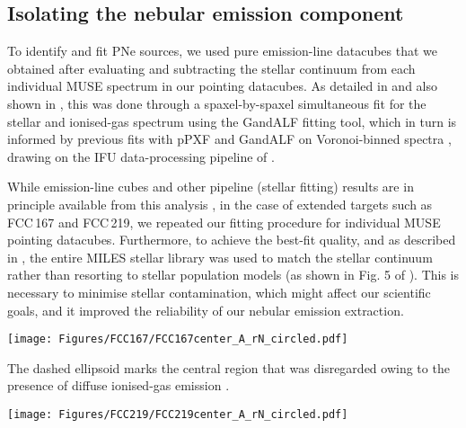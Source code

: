 \documentclass{aa}
\newcommand{\placefigone}{
\begin{figure*}
    \texttt{[image: Figures/FCC167/FCC167center\_A\_rN\_circled.pdf]}
    \caption{FCC\,167: Map of the peak amplitude to residual-noise level ratio (A/rN) of the [\ion{O}{iii}]5007 line, based on our spaxel-by-spaxel fit for the [\ion{O}{iii}] doublet in the emission datacube. The sources detected and labelled PNe are shown by a black circle. The over-luminous object (see Sect. 5.1) is highlighted by a black square. The PNe that mach those reported by \citet{feldmeier_calibrating_2007} are highlighted by blue squares.} The dashed ellipsoid marks the central region that was disregarded owing to the presence of diffuse ionised-gas emission \citep[see also][]{viaene_fornax_2019}.
    \label{fig:FCC167_A_rN}
\end{figure*}
}
\newcommand{\placefigtwo}{
\begin{figure*}
    \texttt{[image: Figures/FCC219/FCC219center\_A\_rN\_circled.pdf]}
    \caption{FCC\,219: Similar to Fig.\ref{fig:FCC167_A_rN}, but show the PNe within FCC\,219. Sources are highlighted by black circles,and blue square indicate the sources that we matched with those of \citet{mcmillan_planetary_1993} within the FOV. The central mask, located towards the south of the FOV (dashed circle), excludes regions affected by diffuse ionised-gas emission \citep[see][]{iodice_fornax3d_2019}. A foreground star is also masked out. This is indicated by the small dashed circle to the right of the FOV.}
    \label{fig:FCC219_A_rN}
\end{figure*}
}
\begin{document}
\subsection{Isolating the nebular emission component}

To identify and fit PNe sources, we used pure emission-line datacubes that we obtained after evaluating and subtracting the stellar continuum from each individual MUSE spectrum in our pointing datacubes. As detailed in \citet{sarzi_fornax3d_2018} and also shown in \citet{viaene_fornax_2019}, this was done through a spaxel-by-spaxel simultaneous fit for the stellar and ionised-gas spectrum using the GandALF \citep{sarzi_sauron_2006} fitting tool, which in turn is informed by previous fits with pPXF \citep{cappellari_parametric_2004, cappellari_improving_2017} and GandALF on Voronoi-binned spectra \citep{cappellari_adaptive_2003}, drawing on the IFU data-processing pipeline of \citet[GIST\footnote{https://abittner.gitlab.io/thegistpipeline}][]{bittner_gist_2019}.

While emission-line cubes and other pipeline (stellar fitting) results are in principle available from this analysis \citep[see also][]{iodice_fornax3d_2019}, in the case of extended targets such as FCC\,167 and FCC\,219, we repeated our fitting procedure for individual MUSE pointing datacubes. Furthermore, to achieve the best-fit quality, and as described in \citet{sarzi_fornax3d_2018}, the entire MILES \citep{sanchez-blazquez_medium-resolution_2006} stellar library was used to match the stellar continuum rather than resorting to stellar population models (as shown in Fig. 5 of \citealp{sarzi_fornax3d_2018}). This is necessary to minimise stellar contamination, which might affect our scientific goals, and it improved the reliability of our nebular emission extraction.

\placefigone
\placefigtwo
\end{document}
